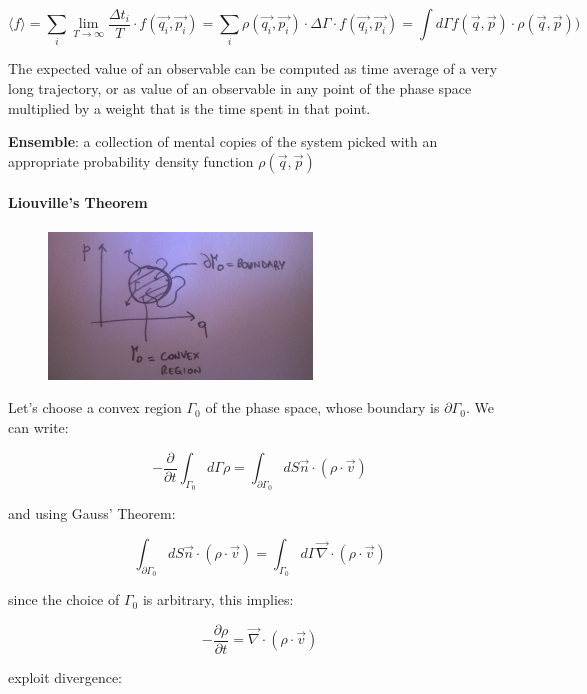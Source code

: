 \documentclass[a4paper, italian, openany]{book}
\begin{document}
$$\langle f \rangle = \sum_i \lim_{T \to \infty} \frac{\Delta t_i}{T} \cdot f(\overrightarrow{q_i}, \overrightarrow{p_i}) = \sum_i \rho(\overrightarrow{q_i}, \overrightarrow{p_i}) \cdot \Delta \Gamma \cdot f(\overrightarrow{q_i}, \overrightarrow{p_i}) = \int d\Gamma  f(\overrightarrow{q}, \overrightarrow{p})\cdot \rho(\overrightarrow{q}, \overrightarrow{p}))$$

The expected value of an observable can be computed as time average of a very long trajectory, or as value of an observable in any point of the phase space multiplied by a weight that is the time spent in that point.

\textbf{Ensemble}: a collection of mental copies of the system picked with an appropriate probability density function $\rho(\overrightarrow{q}, \overrightarrow{p})$

\paragraph{Liouville's Theorem}

\begin{figure}[H]
\centering
\includegraphics[width=70mm]{img/figure3.jpg}
\end{figure}

Let's choose a convex region $\Gamma_0$ of the phase space, whose boundary is $\partial \Gamma_0$. We can write:

$$-\frac{\partial}{\partial t} \int_{\Gamma_0} d\Gamma \rho = \int_{\partial \Gamma_0} dS \overrightarrow{n} \cdot (\rho \cdot \overrightarrow{v})$$

and using Gauss' Theorem:

$$\int_{\partial \Gamma_0} dS \overrightarrow{n} \cdot (\rho \cdot \overrightarrow{v}) =  \int_{\Gamma_0} d\Gamma \overrightarrow{\nabla} \cdot (\rho \cdot \overrightarrow{v})$$

since the choice of $\Gamma_0$ is arbitrary, this implies:

$$-\frac{\partial \rho}{\partial t} = \overrightarrow{\nabla} \cdot (\rho \cdot \overrightarrow{v})$$

exploit divergence:
\end{document}
